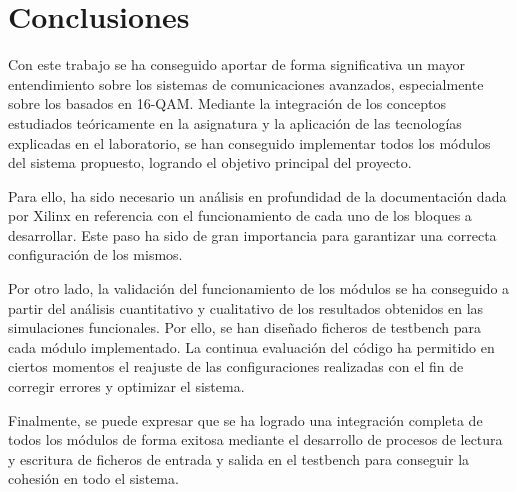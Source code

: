 \chapter{Conclusiones}
\label{section:conclusiones}

Con este trabajo se ha conseguido aportar de forma significativa un mayor entendimiento sobre los sistemas de comunicaciones avanzados, especialmente sobre los basados en 16-QAM. Mediante la integración de los conceptos estudiados teóricamente en la asignatura y la aplicación de las tecnologías explicadas en el laboratorio, se han conseguido implementar todos los módulos del sistema propuesto, logrando el objetivo principal del proyecto.

\vspace{3mm}

Para ello, ha sido necesario un análisis en profundidad de la documentación dada por Xilinx en referencia con el funcionamiento de cada uno de los bloques a desarrollar. Este paso ha sido de gran importancia para garantizar una correcta configuración de los mismos. 

\vspace{3mm}

Por otro lado, la validación del funcionamiento de los módulos se ha conseguido a partir del análisis cuantitativo y cualitativo de los resultados obtenidos en las simulaciones funcionales. Por ello, se han diseñado ficheros de testbench para cada módulo implementado. La continua evaluación del código ha permitido en ciertos momentos el reajuste de las configuraciones realizadas con el fin de corregir errores y optimizar el sistema.

\vspace{3mm}

Finalmente, se puede expresar que se ha logrado una integración completa  de todos los módulos de forma exitosa mediante el desarrollo de procesos de lectura y escritura de ficheros de entrada y salida en el testbench para conseguir la cohesión en todo el sistema.

